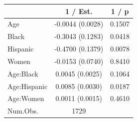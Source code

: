 
\begin{tabular}[t]{lcc}
\toprule
  & 1 / Est. & 1 / p\\
\midrule
Age & -0.0044 
(0.0028) & 0.1507\\
Black & -0.3043 
(0.1283) & 0.0418\\
Hispanic & -0.4700 
(0.1379) & 0.0078\\
Women & -0.0153 
(0.0740) & 0.8410\\
Age:Black & 0.0045 
(0.0025) & 0.1064\\
Age:Hispanic & 0.0085 
(0.0030) & 0.0187\\
Age:Women & 0.0011 
(0.0015) & 0.4610\\
\midrule
Num.Obs. & 1729 & \\
\bottomrule
\end{tabular}
